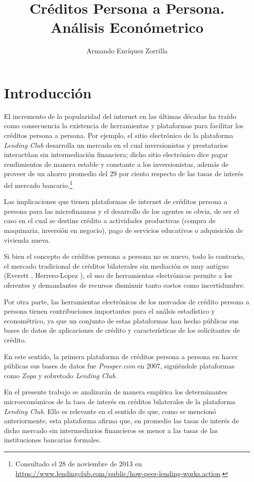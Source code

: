 \documentclass[12pt, fleqn, letterpaper, oneside]{amsart}
\title[Trabajo Final: Créditos Persona a Persona]
	  {Créditos Persona a Persona. Análisis Económetrico}
\author{Armando Enríquez Zorrilla}
\date{}
\begin{document}
\maketitle

\section{Introducción}

El incremento  de la popularidad del internet en las últimas décadas ha traído como consecuencia la existencia de herramientas y plataformas para facilitar los créditos persona a persona. Por ejemplo, el sitio electrónico de la plataforma \emph{Lending Club} desarrolla un mercado en el cual inversionistas y prestatarios interactúan sin intermediación financiera; dicho sitio electrónico dice pagar rendimientos de manera estable y constante a los inversionistas, además de proveer de un ahorro promedio del 29 por ciento respecto de las tasas de interés del mercado bancario.\footnote{Consultado el 28 de noviembre de 2013 en \url{https://www.lendingclub.com/public/how-peer-lending-works.action}.}

Las implicaciones que tienen plataformas de internet de créditos persona a persona para las microfinanzas y el desarrollo de los agentes es obvia, de ser el caso en el cual se destine crédito a actividades productivas (compra de maquinaria, inversión en negocio), pago de servicios educativos o adquisición de vivienda nueva. 

Si bien el concepto de créditos persona a persona no es nuevo, todo lo contrario, el mercado tradicional de créditos bilaterales sin mediación es muy antiguo (Everett \cite{everett}, Herrero-Lopez \cite{herrero}), el uso de herramientas electrónicas permite a los oferentes y demandantes de recursos disminuir tanto costos como incertidumbre. 

Por otra parte, las herramientas electrónicas de los mercados de crédito persona a persona tienen contribuciones importantes para el análsis estadístico y econométrico, ya que un conjunto de estas plataformas han hecho públicas sus  bases de datos de aplicaciones de crédito y características de los solicitantes de crédito. 

En este sentido, la primera plataforma de créditos persona a persona en hacer públicas sus bases de datos fue \emph{Prosper.com} en 2007, siguiéndole plataformas como \emph{Zopa} y sobretodo \emph{Lending Club}. 

En el presente trabajo se analizarán de manera empírica los determinantes microeconómicos de la tasa de interés en créditos bilaterales de la plataforma \emph{Lending Club}. Ello es relevante en el sentido de que, como se mencionó anteriormente, esta plataforma afirma que, en promedio las tasas de interés de dicho mercado sin intermediarios financieros es menor a las tasas de las instituciones bancarias formales. 
\end{document}
